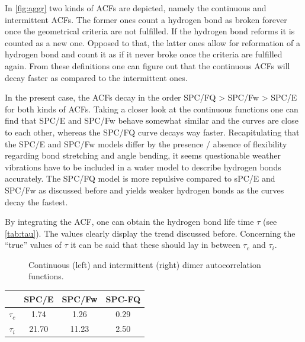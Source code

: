 \documentclass[a4paper,12pt]{scrartcl}
\begin{document}
		In \autoref{fig:aggr} two kinds of ACFs are depicted, namely the continuous and intermittent ACFs. The former ones count a hydrogen bond as broken forever once the geometrical criteria are not fulfilled. If the hydrogen bond reforms it is counted as a new one. Opposed to that, the latter ones allow for reformation of a hydrogen bond and count it as if it never broke once the criteria are fulfilled again. From these definitions one can figure out that the continuous ACFs will decay faster as compared to the intermittent ones.
		
		In the present case, the ACFs decay in the order SPC/FQ > SPC/Fw > SPC/E for both kinds of ACFs. Taking a closer look at the continuous functions one can find that SPC/E and SPC/Fw behave somewhat similar and the curves are close to each other, whereas the SPC/FQ curve decays way faster. Recapitulating that the SPC/E and SPC/Fw models differ by the presence / absence of flexibility regarding bond stretching and angle bending, it seems questionable weather vibrations have to be included in a water model to describe hydrogen bonds accurately. The SPC/FQ model is more repulsive compared to sPC/E and SPC/Fw as discussed before and yields weaker hydrogen bonds as the curves decay the fastest.
		
		By integrating the ACF, one can obtain the hydrogen bond life time $ \tau $ (see \autoref{tab:tau}). The values clearly display the trend discussed before. Concerning the \enquote{true} values of $ \tau $ it can be said that these should lay in between $ \tau_c $ and $ \tau_i  $.
		\begin{figure}
			\centering
			
			\vspace{-20pt}
			\caption{Continuous (left) and intermittent (right) dimer autocorrelation functions.}
			\label{fig:aggr}
		\end{figure}
		\begin{table}
			\centering
			\label{tab:tau}
			\begin{tabular}{c|ccc}
				\toprule
				& SPC/E & SPC/Fw & SPC-FQ \\ 
				\midrule
				$ \tau_c $ & 1.74 & 1.26 & 0.29 \\
				$ \tau_i $ & 21.70 & 11.23 & 2.50\\
				\bottomrule
			\end{tabular}
		\end{table}
\end{document}
